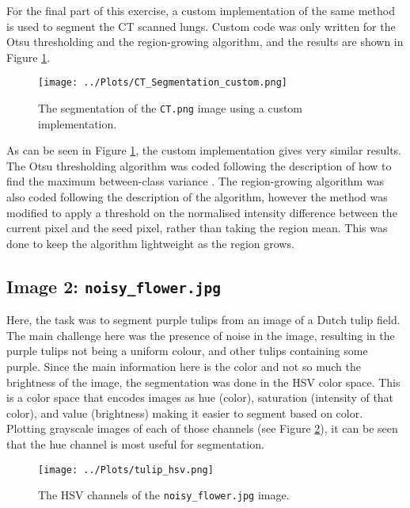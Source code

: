 \documentclass[12pt]{report} %
\begin{document}
For the final part of this exercise, a custom implementation of the same method is used to segment the CT scanned lungs. Custom code was only written for the Otsu thresholding and the region-growing algorithm, and the results are shown in Figure \ref{fig:CT_custom_segmentation}.

\begin{figure}[htbp]
    \centering
    \texttt{[image: ../Plots/CT\_Segmentation\_custom.png]}
    \caption{The segmentation of the \texttt{CT.png} image using a custom implementation.}
    \label{fig:CT_custom_segmentation}
\end{figure}

As can be seen in Figure \ref{fig:CT_custom_segmentation}, the custom implementation gives very similar results. The Otsu thresholding algorithm was coded following the description of how to find the maximum between-class variance \cite{baeldung_otsu_segmentation}. The region-growing algorithm was also coded following the description of the algorithm\cite{sbme_tutorials_cv}, however the method was modified to apply a threshold on the normalised intensity difference between the current pixel and the seed pixel, rather than taking the region mean. This was done to keep the algorithm lightweight as the region grows.

\subsection{Image 2: \texttt{noisy\_flower.jpg}}

Here, the task was to segment purple tulips from an image of a Dutch tulip field. The main challenge here was the presence of noise in the image, resulting in the purple tulips not being a uniform colour, and other tulips containing some purple. Since the main information here is the color and not so much the brightness of the image, the segmentation was done in the HSV color space. This is a color space that encodes images as hue (color), saturation (intensity of that color), and value (brightness) making it easier to segment based on color\cite{wiki_hsv}. Plotting grayscale images of each of those channels (see Figure \ref{fig:flower_hsv}), it can be seen that the hue channel is most useful for segmentation.

\begin{figure}[htbp]
    \centering
    \texttt{[image: ../Plots/tulip\_hsv.png]}
    \caption{The HSV channels of the \texttt{noisy\_flower.jpg} image.}
    \label{fig:flower_hsv}
\end{figure}
\end{document}
